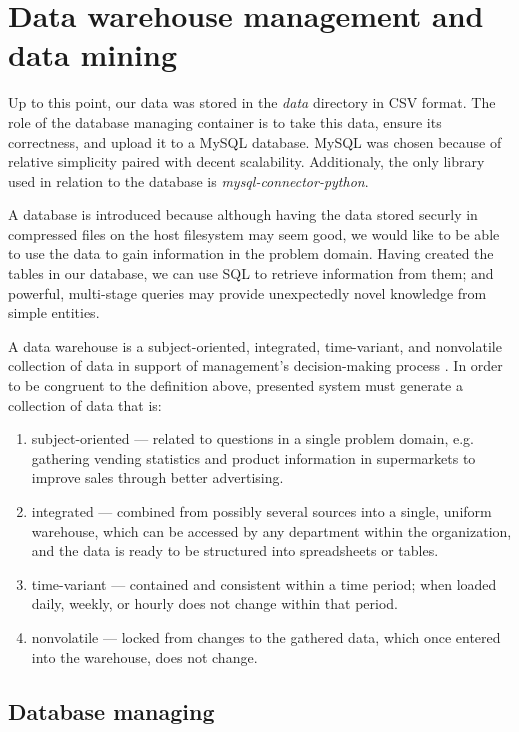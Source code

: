 \chapter{Data warehouse management and data mining}

\label{ch:database}
Up to this point, our data was stored in the \textit{data} directory in CSV format. The role of the database managing container is to take this data, ensure its correctness, and upload it to a MySQL database. MySQL was chosen because of relative simplicity paired with decent scalability. Additionaly, the only library used in relation to the database is \textit{mysql-connector-python}. \par
A database is introduced because although having the data stored securly in compressed files on the host filesystem may seem good, we would like to be able to use the data to gain information in the problem domain. Having created the tables in our database, we can use SQL to retrieve information from them; and powerful, multi-stage queries may provide unexpectedly novel knowledge from simple entities. \par
A data warehouse is a subject-oriented, integrated, time-variant, and nonvolatile collection of data in support of management's decision-making process \cite{dataWarehouseMining}. In order to be congruent to the definition above, presented system must generate a collection of data that is:

\begin{enumerate}
    \item subject-oriented --- related to questions in a single problem domain, e.g. gathering vending statistics and product information in supermarkets to improve sales through better advertising.
    \item integrated --- combined from possibly several sources into a single, uniform warehouse, which can be accessed by any department within the organization, and the data is ready to be structured into spreadsheets or tables.
    \item time-variant --- contained and consistent within a time period; when loaded daily, weekly, or hourly does not change within that period.
    \item nonvolatile --- locked from changes to the gathered data, which once entered into the warehouse, does not change.
\end{enumerate}

\section{Database managing}

